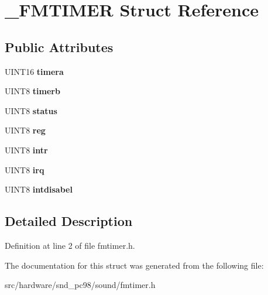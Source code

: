 \hypertarget{struct__FMTIMER}{\section{\-\_\-\-F\-M\-T\-I\-M\-E\-R Struct Reference}
\label{struct__FMTIMER}
}
\subsection*{Public Attributes}
\begin{DoxyCompactItemize}
\item 
\hypertarget{struct__FMTIMER_a7253630f3d266e29275f8b92a716a724}{U\-I\-N\-T16 {\bfseries timera}}\label{struct__FMTIMER_a7253630f3d266e29275f8b92a716a724}

\item 
\hypertarget{struct__FMTIMER_a29cfdff1f4123c88d5b5b01d75d07adc}{U\-I\-N\-T8 {\bfseries timerb}}\label{struct__FMTIMER_a29cfdff1f4123c88d5b5b01d75d07adc}

\item 
\hypertarget{struct__FMTIMER_aee54f52775aaf13ef6d6bd89284dc78c}{U\-I\-N\-T8 {\bfseries status}}\label{struct__FMTIMER_aee54f52775aaf13ef6d6bd89284dc78c}

\item 
\hypertarget{struct__FMTIMER_aeb0154242b075647598585e5f674465f}{U\-I\-N\-T8 {\bfseries reg}}\label{struct__FMTIMER_aeb0154242b075647598585e5f674465f}

\item 
\hypertarget{struct__FMTIMER_a867dd9ab469fde1ff1733f85a5e0b433}{U\-I\-N\-T8 {\bfseries intr}}\label{struct__FMTIMER_a867dd9ab469fde1ff1733f85a5e0b433}

\item 
\hypertarget{struct__FMTIMER_a4ca5ef67d7a359cf86afd7b21ad80c30}{U\-I\-N\-T8 {\bfseries irq}}\label{struct__FMTIMER_a4ca5ef67d7a359cf86afd7b21ad80c30}

\item 
\hypertarget{struct__FMTIMER_ab024217aca07c3f0cd58517695870d05}{U\-I\-N\-T8 {\bfseries intdisabel}}\label{struct__FMTIMER_ab024217aca07c3f0cd58517695870d05}

\end{DoxyCompactItemize}


\subsection{Detailed Description}


Definition at line 2 of file fmtimer.\-h.



The documentation for this struct was generated from the following file\-:\begin{DoxyCompactItemize}
\item 
src/hardware/snd\-\_\-pc98/sound/fmtimer.\-h\end{DoxyCompactItemize}
